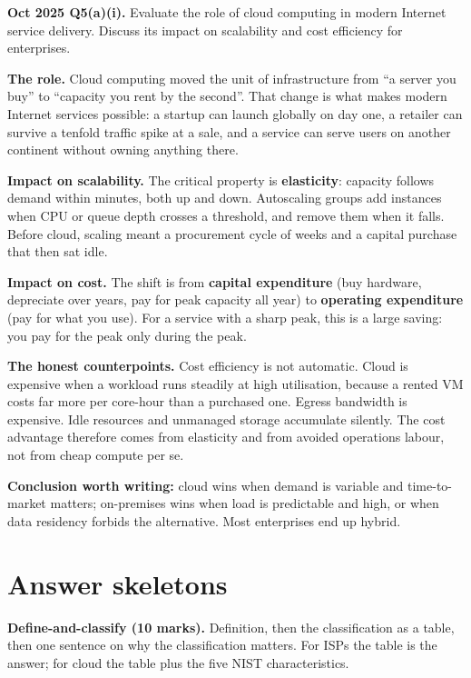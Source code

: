 \documentclass[11pt,a4paper]{article}
\begin{document}
\begin{pyqbox}
\textbf{Oct 2025 Q5(a)(i).} Evaluate the role of cloud computing in modern Internet service delivery. Discuss its impact on scalability and cost efficiency for enterprises.
\end{pyqbox}

\begin{solbox}
\textbf{The role.} Cloud computing moved the unit of infrastructure from ``a server you buy'' to ``capacity you rent by the second''. That change is what makes modern Internet services possible: a startup can launch globally on day one, a retailer can survive a tenfold traffic spike at a sale, and a service can serve users on another continent without owning anything there.

\textbf{Impact on scalability.} The critical property is \textbf{elasticity}: capacity follows demand within minutes, both up and down. Autoscaling groups add instances when CPU or queue depth crosses a threshold, and remove them when it falls. Before cloud, scaling meant a procurement cycle of weeks and a capital purchase that then sat idle.

\textbf{Impact on cost.} The shift is from \textbf{capital expenditure} (buy hardware, depreciate over years, pay for peak capacity all year) to \textbf{operating expenditure} (pay for what you use). For a service with a sharp peak, this is a large saving: you pay for the peak only during the peak.

\textbf{The honest counterpoints.} Cost efficiency is not automatic. Cloud is expensive when a workload runs steadily at high utilisation, because a rented VM costs far more per core-hour than a purchased one. Egress bandwidth is expensive. Idle resources and unmanaged storage accumulate silently. The cost advantage therefore comes from elasticity and from avoided operations labour, not from cheap compute per se.

\textbf{Conclusion worth writing:} cloud wins when demand is variable and time-to-market matters; on-premises wins when load is predictable and high, or when data residency forbids the alternative. Most enterprises end up hybrid.
\end{solbox}

\section{Answer skeletons}

\begin{answerbox}
\textbf{Define-and-classify (10 marks).} Definition, then the classification as a table, then one sentence on why the classification matters. For ISPs the table is the answer; for cloud the table plus the five NIST characteristics.
\end{answerbox}
\end{document}
